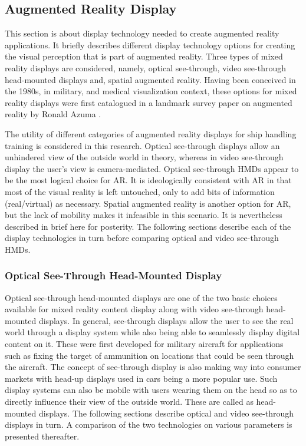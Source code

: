 \subsection{Augmented Reality Display}
This section is about display technology needed to create augmented reality applications. It briefly describes different display technology options for creating the visual perception that is part of augmented reality. Three types of mixed reality displays are considered, namely, optical see-through, video see-through head-mounted displays and, spatial augmented reality. Having been conceived in the 1980s, in military, and medical visualization context, these options for mixed reality displays were first catalogued in a landmark survey paper on augmented reality by Ronald Azuma \parencite{azuma1997survey}. 

The utility of different categories of augmented reality displays for ship handling training is considered in this research. Optical see-through displays allow an unhindered view of the outside world in theory, whereas in video see-through display the user's view is camera-mediated. Optical see-through HMDs appear to be the most logical choice for AR. It is ideologically consistent with AR in that most of the visual reality is left untouched, only to add bits of information (real/virtual) as necessary. Spatial augmented reality is another option for AR, but the lack of mobility makes it infeasible in this scenario. It is nevertheless described in brief here for posterity. The following sections describe each of the display technologies in turn before comparing optical and video see-through HMDs. 

\subsubsection{Optical See-Through Head-Mounted Display}
Optical see-through head-mounted displays are one of the two basic choices available for mixed reality content display along with video see-through head-mounted displays. In general, see-through displays allow the user to see the real world through a display system while also being able to seamlessly display digital content on it. These were first developed for military aircraft for applications such as fixing the target of ammunition on locations that could be seen through the aircraft. The concept of see-through display is also making way into consumer markets with head-up displays used in cars being a more popular use. Such display systems can also be mobile with users wearing them on the head so as to directly influence their view of the outside world. These are called as head-mounted displays. The following sections describe optical and video see-through displays in turn. A comparison of the two technologies on various parameters is presented thereafter.

